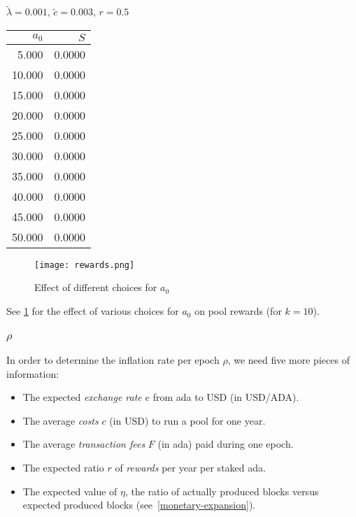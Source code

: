\documentclass[11pt,a4paper]{article}
\begin{document}
\begin{minipage}[t]{\textwidth}
\begin{minipage}[t]{0.32\textwidth}
        \footnotesize
        \begin{flushleft}$\tilde{\lambda}=0.001$, $\tilde{c}=0.003$, $r=0.5$\end{flushleft}
        \begin{tabular}[t]{rr}
            $a_0$ & $S$ \\
            \hline
             5.000 & 0.0000 \\
            10.000 & 0.0000 \\
            15.000 & 0.0000 \\
            20.000 & 0.0000 \\
            25.000 & 0.0000 \\
            30.000 & 0.0000 \\
            35.000 & 0.0000 \\
            40.000 & 0.0000 \\
            45.000 & 0.0000 \\
            50.000 & 0.0000 \\
        \end{tabular}
    \end{minipage}
\end{minipage}

\begin{figure}
\centering
\texttt{[image: rewards.png]}
\caption{Effect of different choices for \(a_0\)}
\label{fig:rewards}
\end{figure}

See \cref{fig:rewards} for the effect of various choices for
\(a_0\) on pool rewards (for \(k=10\)).

\subsubsection{\texorpdfstring{\(\rho\)}{\textbackslash{}rho}}

In order to determine the inflation rate per epoch \(\rho\), we need five
more pieces of information:

\begin{itemize}
\item
  The expected \emph{exchange rate} \(e\) from ada to USD (in USD/ADA).
\item
  The average \emph{costs} \(c\) (in USD) to run a pool for one year.
\item
  The average \emph{transaction fees} \(F\) (in ada) paid during one
  epoch.
\item
  The expected ratio \(r\) of \emph{rewards} per year per staked ada.
\item
  The expected value of $\eta$, the ratio of actually produced blocks
  versus expected produced blocks (see~\ref{monetary-expansion}).
\end{itemize}
\end{document}
